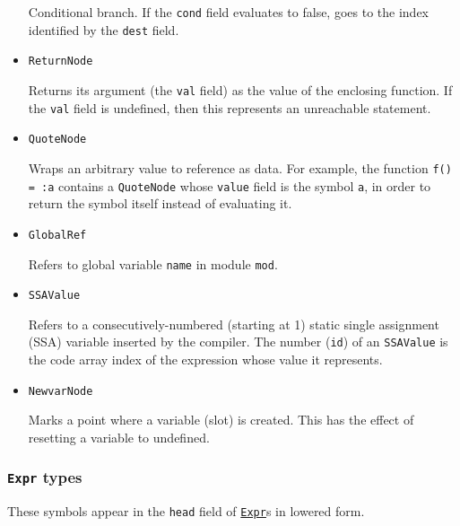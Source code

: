 \begin{itemize}
Conditional branch. If the \texttt{cond} field evaluates to false, goes to the index identified by the \texttt{dest} field.


\item \texttt{ReturnNode}

Returns its argument (the \texttt{val} field) as the value of the enclosing function. If the \texttt{val} field is undefined, then this represents an unreachable statement.


\item \texttt{QuoteNode}

Wraps an arbitrary value to reference as data. For example, the function \texttt{f() = :a} contains a \texttt{QuoteNode} whose \texttt{value} field is the symbol \texttt{a}, in order to return the symbol itself instead of evaluating it.


\item \texttt{GlobalRef}

Refers to global variable \texttt{name} in module \texttt{mod}.


\item \texttt{SSAValue}

Refers to a consecutively-numbered (starting at 1) static single assignment (SSA) variable inserted by the compiler. The number (\texttt{id}) of an \texttt{SSAValue} is the code array index of the expression whose value it represents.


\item \texttt{NewvarNode}

Marks a point where a variable (slot) is created. This has the effect of resetting a variable to undefined.

\end{itemize}


\hypertarget{15302433068188215381}{}


\subsubsection{\texttt{Expr} types}



These symbols appear in the \texttt{head} field of \hyperlink{17120496304147995299}{\texttt{Expr}}s in lowered form.



